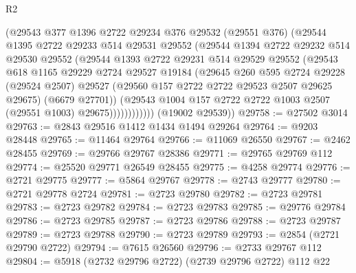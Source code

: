 \begin{lexlean}{R2}
\begin{coremodule}
                  (@29543
                    @377
                    @1396
                    @2722
                    @29234
                    @376
                    @29532
                    (@29551 @376)
                    (@29544
                      @1395
                      @2722
                      @29233
                      @514
                      @29531
                      @29552
                      (@29544
                        @1394
                        @2722
                        @29232
                        @514
                        @29530
                        @29552
                        (@29544
                          @1393
                          @2722
                          @29231
                          @514
                          @29529
                          @29552
                          (@29543
                            @618
                            @1165
                            @29229
                            @2724
                            @29527
                            @19184
                            (@29645
                              @260
                              @595
                              @2724
                              @29228
                              (@29524 @2507)
                              @29527
                              (@29560 @157 @2722 @2722 @29523 @2507 @29625 @29675)
                              (@6679 @27701))
                            (@29543
                              @1004
                              @157
                              @2722
                              @2722
                              @1003
                              @2507
                              (@29551 @1003)
                              @29675))))))))))))
      (@19002 @29539))
@29758 := @27502 @3014
@29763 := @2843 @29516 @1412 @1434 @1494 @29264
@29764 := @9203 @28448
@29765 := @11464 @29764
@29766 := @11069 @26550
@29767 := @2462 @28455
@29769 := @29766 @29767 @28386
@29771 := @29765 @29769 @112
@29774 := @25520 @29771 @26549 @28455
@29775 := @4258 @29774
@29776 := @2721 @29775
@29777 := @5864 @29767
@29778 := @2743 @29777
@29780 := @2721 @29778 @2724
@29781 := @2723 @29780
@29782 := @2723 @29781
@29783 := @2723 @29782
@29784 := @2723 @29783
@29785 := @29776 @29784
@29786 := @2723 @29785
@29787 := @2723 @29786
@29788 := @2723 @29787
@29789 := @2723 @29788
@29790 := @2723 @29789
@29793 := @2854 (@2721 @29790 @2722)
@29794 := @7615 @26560
@29796 := @2733 @29767 @112
@29804 := @5918 (@2732 @29796 @2722) (@2739 @29796 @2722) @112 @22

\end{coremodule}
\end{lexlean}
